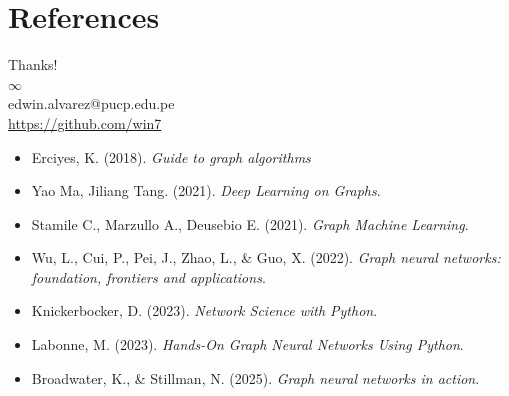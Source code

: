 \documentclass[aspectratio=169]{beamer}
\begin{document}
\section*{References}
    \begin{frame}
        \begin{center}
            {\Huge\calligra Thanks!} \\
            {\Huge $\infty$} \\
            edwin.alvarez@pucp.edu.pe \\
            \url{https://github.com/win7}
        \end{center}
    \end{frame}
    
    \begin{frame}[allowframebreaks]
        \footnotesize %
        
        \begin{itemize}
            \item Erciyes, K. (2018). \textit{Guide to graph algorithms} %
            \item Yao Ma, Jiliang Tang. (2021). \textit{Deep Learning on Graphs}.
            \item Stamile C., Marzullo A., Deusebio E. (2021). \textit{Graph Machine Learning}.
            \item Wu, L., Cui, P., Pei, J., Zhao, L., \& Guo, X. (2022). \textit{Graph neural networks: foundation, frontiers and applications}. %
            \item Knickerbocker, D. (2023). \textit{Network Science with Python}. %
            \item Labonne, M. (2023). \textit{Hands-On Graph Neural Networks Using Python}.
            \item Broadwater, K., \& Stillman, N. (2025). \textit{Graph neural networks in action}. %
        \end{itemize}
    \end{frame}
\end{document}
